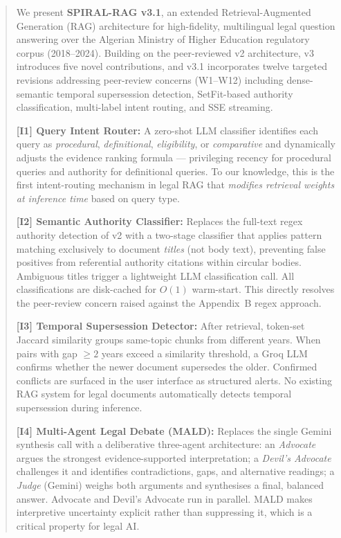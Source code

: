\documentclass[12pt,a4paper]{article}
\begin{document}
\begin{abstract}
We present \textbf{SPIRAL-RAG v3.1}, an extended Retrieval-Augmented Generation (RAG)
architecture for high-fidelity, multilingual legal question answering over the
Algerian Ministry of Higher Education regulatory corpus (2018--2024). Building on
the peer-reviewed v2 architecture, v3 introduces five novel contributions, and v3.1
incorporates twelve targeted revisions addressing peer-review concerns
(W1--W12) including dense-semantic temporal supersession detection, SetFit-based
authority classification, multi-label intent routing, and SSE streaming.

\textbf{[I1] Query Intent Router:} A zero-shot LLM classifier identifies each query as
\emph{procedural}, \emph{definitional}, \emph{eligibility}, or \emph{comparative}
and dynamically adjusts the evidence ranking formula — privileging recency for
procedural queries and authority for definitional queries. To our knowledge, this
is the first intent-routing mechanism in legal RAG that \emph{modifies retrieval
weights at inference time} based on query type.

\textbf{[I2] Semantic Authority Classifier:} Replaces the full-text regex authority
detection of v2 with a two-stage classifier that applies pattern matching
exclusively to document \emph{titles} (not body text), preventing false positives
from referential authority citations within circular bodies. Ambiguous titles trigger
a lightweight LLM classification call. All classifications are disk-cached for
$O(1)$ warm-start. This directly resolves the peer-review concern raised against
the Appendix~B regex approach.

\textbf{[I3] Temporal Supersession Detector:} After retrieval, token-set Jaccard
similarity groups same-topic chunks from different years. When pairs with gap
$\geq 2$ years exceed a similarity threshold, a Groq LLM confirms whether the
newer document supersedes the older. Confirmed conflicts are surfaced in the
user interface as structured alerts. No existing RAG system for legal documents
automatically detects temporal supersession during inference.

\textbf{[I4] Multi-Agent Legal Debate (MALD):} Replaces the single Gemini synthesis
call with a deliberative three-agent architecture: an \emph{Advocate} argues the
strongest evidence-supported interpretation; a \emph{Devil's Advocate} challenges
it and identifies contradictions, gaps, and alternative readings; a \emph{Judge}
(Gemini) weighs both arguments and synthesises a final, balanced answer. Advocate
and Devil's Advocate run in parallel. MALD makes interpretive uncertainty explicit
rather than suppressing it, which is a critical property for legal AI.


\end{abstract}
\end{document}
